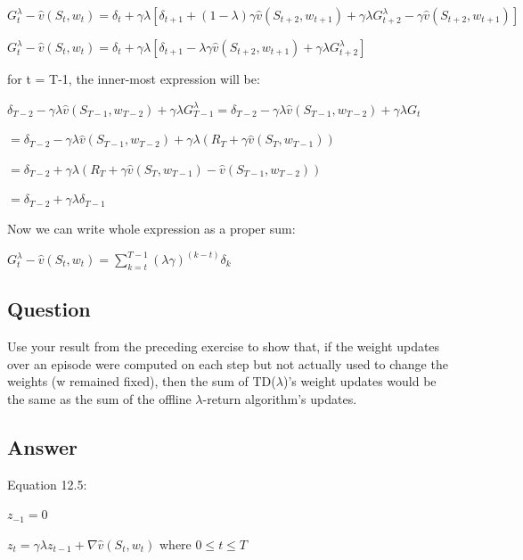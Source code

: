 \documentclass[11pt]{article}
\begin{document}
    \noindent $ G_{t}^{\lambda} - \hat{v}(S_t, w_t) = \delta_{t} +  \gamma \lambda [ \delta_{t+1} + (1-\lambda) \gamma \hat{v}(S_{t+2},w_{t+1}) +  \gamma \lambda G_{t+2}^\lambda - \gamma \hat{v}(S_{t+2},w_{t+1})] $

    \noindent $ G_{t}^{\lambda} - \hat{v}(S_t, w_t) = \delta_{t} +  \gamma \lambda [ \delta_{t+1} -\lambda \gamma \hat{v}(S_{t+2},w_{t+1}) +  \gamma \lambda G_{t+2}^\lambda] $

    \hfill \break
    \noindent for t = T-1, the inner-most expression will be:

    \noindent $ \delta_{T-2} - \gamma \lambda \hat{v}(S_{T-1}, w_{T-2}) + \gamma \lambda G_{T-1}^\lambda = \delta_{T-2} - \gamma \lambda \hat{v}(S_{T-1}, w_{T-2}) + \gamma \lambda G_t $

    \noindent $ = \delta_{T-2} - \gamma \lambda \hat{v}(S_{T-1}, w_{T-2}) + \gamma \lambda (R_T + \gamma \hat{v}(S_{T}, w_{T-1}) ) $

    \noindent $ = \delta_{T-2} + \gamma \lambda (R_T + \gamma \hat{v}(S_{T}, w_{T-1}) - \hat{v}(S_{T-1}, w_{T-2}) ) $

    \noindent $ = \delta_{T-2} + \gamma \lambda \delta_{T-1} $

    \hfill \break
    \noindent Now we can write whole expression as a proper sum:

    \noindent $ G_{t}^{\lambda} - \hat{v}(S_t, w_t) = \sum_{k=t}^{T-1} (\lambda \gamma)^{(k-t)} \delta_{k} $

    \subsection{Question}

    Use your result from the preceding exercise to show that, if the weight updates over an episode were computed on each step but not actually used to change the weights (w remained fixed),
    then the sum of TD($\lambda$)’s weight updates would be the same as the sum of the offline $\lambda$-return algorithm’s updates.

    \subsection*{Answer}

    \noindent Equation 12.5:

    \noindent $ z_{-1} = 0 $

    \noindent $ z_{t} = \gamma \lambda z_{t-1} + \nabla \hat{v}(S_t, w_t) $ where $ 0 \le t \le T $
\end{document}
